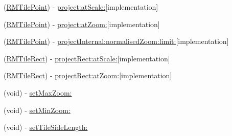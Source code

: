 \begin{DoxyCompactItemize}
(\hyperlink{struct_r_m_tile_point}{R\-M\-Tile\-Point}) -\/ \hyperlink{interface_r_m_fractal_tile_projection_a794c40f61be19f6efcb23e95a45ab1b4}{project\-:at\-Scale\-:}{\ttfamily  \mbox{[}implementation\mbox{]}}
\item 
(\hyperlink{struct_r_m_tile_point}{R\-M\-Tile\-Point}) -\/ \hyperlink{interface_r_m_fractal_tile_projection_afff85793493770d6424965f65c5690f7}{project\-:at\-Zoom\-:}{\ttfamily  \mbox{[}implementation\mbox{]}}
\item 
(\hyperlink{struct_r_m_tile_point}{R\-M\-Tile\-Point}) -\/ \hyperlink{interface_r_m_fractal_tile_projection_a955ae8a9935b4272437db0deb4e19869}{project\-Internal\-:normalised\-Zoom\-:limit\-:}{\ttfamily  \mbox{[}implementation\mbox{]}}
\item 
(\hyperlink{struct_r_m_tile_rect}{R\-M\-Tile\-Rect}) -\/ \hyperlink{interface_r_m_fractal_tile_projection_aca623bc1c542e85df15c30cfd2233b88}{project\-Rect\-:at\-Scale\-:}{\ttfamily  \mbox{[}implementation\mbox{]}}
\item 
(\hyperlink{struct_r_m_tile_rect}{R\-M\-Tile\-Rect}) -\/ \hyperlink{interface_r_m_fractal_tile_projection_abd518c9cae2d4440be0d00be14dff12b}{project\-Rect\-:at\-Zoom\-:}{\ttfamily  \mbox{[}implementation\mbox{]}}
\item 
(void) -\/ \hyperlink{interface_r_m_fractal_tile_projection_a1de5623a97b039eb67df69dd9b76cd7a}{set\-Max\-Zoom\-:}
\item 
(void) -\/ \hyperlink{interface_r_m_fractal_tile_projection_ac749932c5662241d26cbed5ecead0509}{set\-Min\-Zoom\-:}
\item 
(void) -\/ \hyperlink{interface_r_m_fractal_tile_projection_a14bce0b9cfa03a35c689e5b59ffd1129}{set\-Tile\-Side\-Length\-:}
\end{DoxyCompactItemize}
